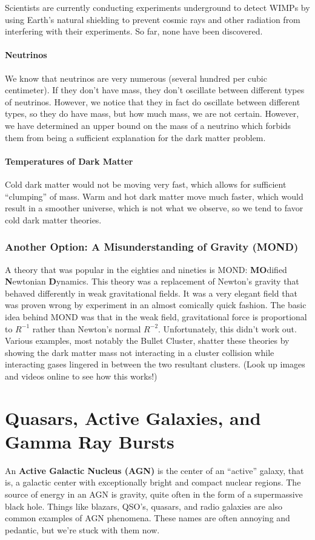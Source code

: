 \documentclass{article}
\begin{document}
	\noindent Scientists are currently conducting experiments underground to detect WIMPs by using Earth's natural shielding to prevent cosmic rays and other radiation from interfering with their experiments. So far, none have been discovered.
	
	\paragraph{Neutrinos} We know that neutrinos are very numerous (several hundred per cubic centimeter). If they don't have mass, they don't oscillate between different types of neutrinos. However, we notice that they in fact do oscillate between different types, so they do have mass, but how much mass, we are not certain. However, we have determined an upper bound on the mass of a neutrino which forbids them from being a sufficient explanation for the dark matter problem.
	\paragraph{Temperatures of Dark Matter} Cold dark matter would not be moving very fast, which allows for sufficient ``clumping'' of mass. Warm and hot dark matter move much faster, which would result in a smoother universe, which is not what we observe, so we tend to favor cold dark matter theories.
	\subsubsection{Another Option: A Misunderstanding of Gravity (MOND)} A theory that was popular in the eighties and nineties is MOND: \textbf{MO}dified \textbf{N}ewtonian \textbf{D}ynamics. This theory was a replacement of Newton's gravity that behaved differently in weak gravitational fields. It was a very elegant field that was proven wrong by experiment in an almost comically quick fashion. The basic idea behind MOND was that in the weak field, gravitational force is proportional to $R^{-1}$ rather than Newton's normal $R^{-2}$. Unfortunately, this didn't work out.\\
	
	\noindent Various examples, most notably the Bullet Cluster, shatter these theories by showing the dark matter mass not interacting in a cluster collision while interacting gases lingered in between the two resultant clusters. (Look up images and videos online to see how this works!)
	
	\section{Quasars, Active Galaxies, and Gamma Ray Bursts}
	An \textbf{Active Galactic Nucleus (AGN)} is the center of an ``active'' galaxy, that is, a galactic center with exceptionally bright and compact nuclear regions. The source of energy in an AGN is gravity, quite often in the form of a supermassive black hole. Things like blazars, QSO's, quasars, and radio galaxies are also common examples of AGN phenomena. These names are often annoying and pedantic, but we're stuck with them now.
\end{document}
